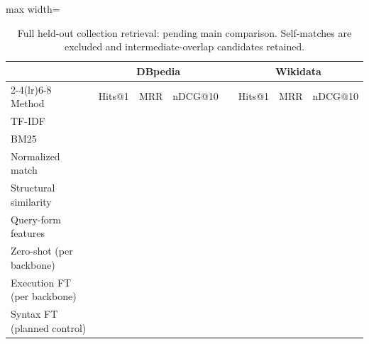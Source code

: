 \begin{table}[t]
\centering
\caption{Full held-out collection retrieval: pending main comparison.
Self-matches are excluded and intermediate-overlap candidates retained.
}
\label{tab:fullcollection}
\small
\setlength{\tabcolsep}{5pt}
\begin{adjustbox}{max width=\textwidth}
\begin{tabular}{l ccc p{0pt} ccc}
\toprule
& \multicolumn{3}{c}{\textbf{DBpedia}} & & \multicolumn{3}{c}{\textbf{Wikidata}}\\
\cmidrule(lr){2-4}\cmidrule(lr){6-8}
Method & Hits@1 & MRR & nDCG@10 & & Hits@1 & MRR & nDCG@10\\
\midrule
TF-IDF & \hp{--} & \hp{--} & \hp{--} & & \hp{--} & \hp{--} & \hp{--}\\
BM25 & \hp{--} & \hp{--} & \hp{--} & & \hp{--} & \hp{--} & \hp{--}\\
Normalized match & \hp{--} & \hp{--} & \hp{--} & & \hp{--} & \hp{--} & \hp{--}\\
Structural similarity & \hp{--} & \hp{--} & \hp{--} & & \hp{--} & \hp{--} & \hp{--}\\
Query-form features & \hp{--} & \hp{--} & \hp{--} & & \hp{--} & \hp{--} & \hp{--}\\
Zero-shot (per backbone) & \hp{--} & \hp{--} & \hp{--} & & \hp{--} & \hp{--} & \hp{--}\\
Execution FT (per backbone) & \hp{--} & \hp{--} & \hp{--} & & \hp{--} & \hp{--} & \hp{--}\\
Syntax FT (planned control) & \hp{--} & \hp{--} & \hp{--} & & \hp{--} & \hp{--} & \hp{--}\\
\bottomrule
\end{tabular}
\end{adjustbox}
\end{table}
